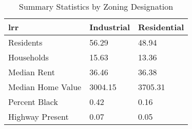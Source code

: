 \begin{table}[h]
\centering
\caption{Summary Statistics by Zoning Designation}
\label{tab:summary_stats_zone}
\begin{tabularx}{\textwidth}{X|X|X}{lrr}
\toprule
 & Industrial & Residential \\
\midrule
Residents & 56.29 & 48.94 \\
Households & 15.63 & 13.36 \\
Median Rent & 36.46 & 36.38 \\
Median Home Value & 3004.15 & 3705.31 \\
Percent Black & 0.42 & 0.16 \\
Highway Present & 0.07 & 0.05 \\
\bottomrule
\end{tabularx}
\end{table}
